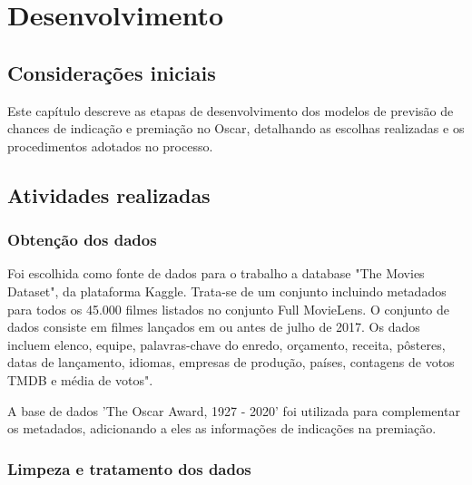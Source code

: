 \chapter[Desenvolvimento]{Desenvolvimento}
    \section{Considerações iniciais}
    Este capítulo descreve as etapas de desenvolvimento dos modelos de previsão de chances de indicação e premiação no Oscar, detalhando as escolhas realizadas e os procedimentos adotados no processo.

    \section{Atividades realizadas}

        \subsection{Obtenção dos dados}\par

        Foi escolhida como fonte de dados para o trabalho a database "The Movies Dataset", da plataforma Kaggle. Trata-se de um conjunto incluindo metadados para todos os 45.000 filmes listados no conjunto Full MovieLens. O conjunto de dados consiste em filmes lançados em ou antes de julho de 2017. Os dados incluem elenco, equipe, palavras-chave do enredo, orçamento, receita, pôsteres, datas de lançamento, idiomas, empresas de produção, países, contagens de votos TMDB e média de votos".\cite{kaggle2017}\par

        A base de dados 'The Oscar Award, 1927 - 2020' foi utilizada para complementar os metadados, adicionando a eles as informações de indicações na premiação.\cite{kaggle2019}

        \subsection{Limpeza e tratamento dos dados}\par
        
